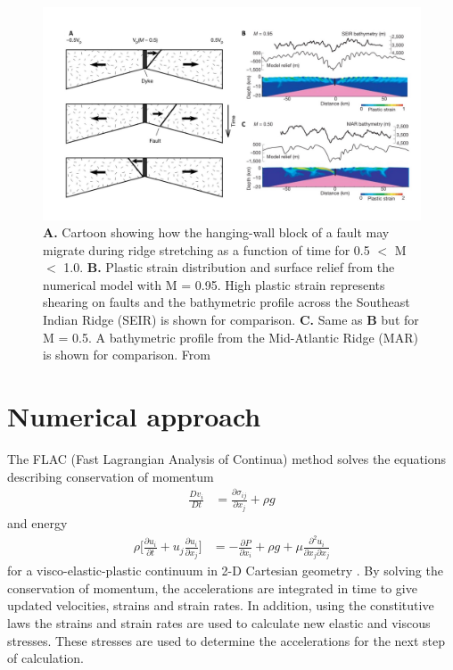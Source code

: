 \documentclass[letterpaper,12pt,notitle]{memphisthesis}                     %
\begin{document}
\begin{figure}[!htb]
	\centering
	\includegraphics[width=0.99\linewidth]{./figs/fig1.pdf}
	\caption{\textbf{A.} Cartoon showing how the hanging-wall block of a fault may migrate during ridge stretching as a function of time for 0.5 $<$ M $<$ 1.0. \textbf{B.} Plastic strain distribution and surface relief from the numerical model with M = 0.95. High plastic strain represents shearing on faults and the bathymetric profile across the Southeast Indian Ridge (SEIR) is shown for comparison. \textbf{C.} Same as \textbf{B} but for M = 0.5. A bathymetric profile from the Mid-Atlantic Ridge (MAR) is shown for comparison. From \citet{Buck2005}}
	\label{fig:mfactor}
\end{figure}

\section{Numerical approach}
The FLAC (Fast Lagrangian Analysis of Continua) method \citep{Cundall1982, Poliakov1993} solves the equations describing conservation of momentum
\begin{align}
 \frac{D v_i}{D t} & = \frac{\partial \sigma_{ij}}{\partial x_{j}} + \rho g
\end{align}
\noindent and energy
\begin{align}
 \rho \bigg[ \frac{\partial u_i}{\partial t} + u_j\frac{\partial u_i}{\partial x_j} \bigg] & = -\frac{\partial P}{\partial x_{i}} + \rho g + \mu \frac{\partial^2 u_i}{\partial x_j \partial x_j}
\end{align}
\noindent for a visco-elastic-plastic continuum in 2-D Cartesian geometry \citep{Lavier2002}. By solving the conservation of momentum, the accelerations are integrated in time to give updated velocities, strains and strain rates. In addition, using the constitutive laws the strains and strain rates are used to calculate new elastic and viscous stresses. These stresses are used to determine the accelerations for the next step of calculation.
\end{document}
